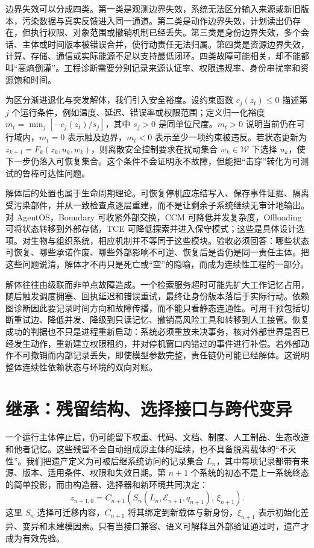 边界失效可以分成四类。第一类是观测边界失效，系统无法区分输入来源或新旧版本，污染数据与真实反馈进入同一通道。第二类是动作边界失效，计划读出仍存在，但执行权限、对象范围或撤销机制已经丢失。第三类是身份边界失效，多个会话、主体或时间版本被错误合并，使行动责任无法归属。第四类是资源边界失效，计算、存储、通信或实际能源不足以支持最低闭环。四类故障可能相关，却不能都叫“高熵倒灌”。工程诊断需要分别记录来源认证率、权限违规率、身份串扰率和资源饱和时间。

为区分渐进退化与突发解体，我们引入安全裕度。设约束函数 $c_j(z_t)\le0$ 描述第 $j$ 个运行条件，例如温度、延迟、错误率或权限范围；定义归一化裕度 $m_t=\min_j[-c_j(z_t)/s_j]$，其中 $s_j>0$ 是同单位尺度。$m_t>0$ 说明当前仍在可行域内，$m_t=0$ 表示触及边界，$m_t<0$ 表示至少一项约束被违反。若状态更新为 $z_{k+1}=F_k(z_k,u_k,w_k)$，则离散安全控制要求在扰动集合 $w_k\in\mathcal W$ 下选择 $u_k$，使下一步仍落入可恢复集合。这个条件不会证明永不故障，但能把“击穿”转化为可测试的鲁棒可达性问题。

解体后的处置也属于生命周期理论。可恢复停机应冻结写入、保存事件证据、隔离受污染部件，并从一致检查点逐层重建，而不是让剩余子系统继续无审计地输出。对 AgentOS，Boundary 可收紧外部交换，CCM 可降低并发复杂度，Offloading 可将状态转移到外部存储，TCE 可降低探索并进入保守模式；这些是具体设计选项。对生物与组织系统，相应机制并不等同于这些模块。验收必须回答：哪些状态可恢复、哪些承诺作废、哪些外部影响不可逆、恢复后是否仍是同一责任主体。把这些问题说清，解体才不再只是死亡或“空”的隐喻，而成为连续性工程的一部分。

解体往往由级联而非单点故障造成。一个检索服务超时可能先扩大工作记忆占用，随后触发调度拥塞、回执延迟和错误重试，最终让身份版本落后于实际行动。依赖图诊断因此要记录时间方向和故障传播，而不能只看静态连通性。可用干预包括切断重试边、降低并发、降级到只读记忆、撤销高风险工具和转移到人工接管。恢复成功的判据也不只是进程重新启动：系统必须重放未决事务，核对外部世界是否已经发生动作，重新建立权限租约，并对停机窗口内错过的事件进行补偿。若外部动作不可撤销而内部记录丢失，即使模型参数完整，责任链仍可能已经解体。这说明整体连续性依赖状态与环境的双向对账。

\section{继承：残留结构、选择接口与跨代变异}
\label{sec:extinction}

一个运行主体停止后，仍可能留下权重、代码、文档、制度、人工制品、生态改造和他者记忆。这些残留不会自动组成原主体的延续，也不具备脱离载体的“不灭性”。我们把遗产定义为可被后继系统访问的记录集合 $L_n$，其中每项记录都带有来源、版本、适用条件、权限和失效日期。第 $n+1$ 个系统的初态不是上一系统终态的简单投影，而由构造器、选择器和新环境共同决定：
\begin{equation}
    z_{n+1,0}=C_{n+1}\!\left(S_n(L_n,\mathcal E_{n+1},q_{n+1}),\,\xi_{n+1}\right).
\end{equation}
这里 $S_n$ 选择可迁移内容，$C_{n+1}$ 将其绑定到新载体与新身份，$\xi_{n+1}$ 表示初始化差异、变异和未建模因素。只有当接口兼容、语义可解释且外部验证通过时，遗产才成为有效先验。

